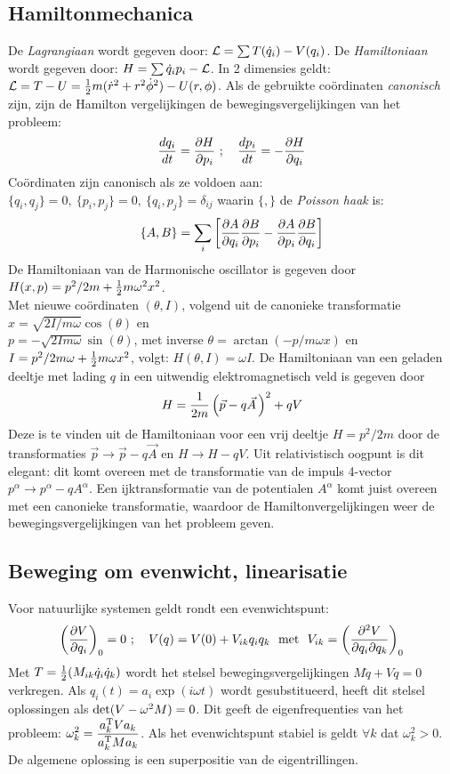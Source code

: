 \documentclass[twoside]{report}
\begin{document}
\subsection{Hamiltonmechanica}
De {\it Lagrangiaan} wordt gegeven door: ${\cal L}=\sum T(\dot{q}_i)-V(q_i)$.
De {\it Hamiltoniaan} wordt gegeven door: $H=\sum\dot{q}_ip_i-{\cal L}$. In 2
dimensies geldt: ${\cal L}=T-U=\mbox{$\frac{1}{2}$} m(\dot{r}^2+r^2\dot{\phi}^2)-U(r,\phi)$.
\npar
Als de gebruikte co\"ordinaten {\it canonisch} zijn, zijn de Hamilton
vergelijkingen de bewegingsvergelijkingen van het probleem:
\[
\frac{dq_i}{dt}=\frac{\partial H}{\partial p_i}~;~~~\frac{dp_i}{dt}=-\frac{\partial H}{\partial q_i}
\]
Co\"ordinaten zijn canonisch als ze voldoen aan:
$\{q_i,q_j\}=0,~\{p_i,p_j\}=0,~\{q_i,p_j\}=\delta_{ij}$ waarin $\{,\}$ de
{\it Poisson haak} is:
\[
\{A,B\}=\sum\limits_i\left[\frac{\partial A}{\partial q_i}\frac{\partial B}{\partial p_i}-\frac{\partial A}{\partial p_i}\frac{\partial B}{\partial q_i}\right]
\]
De Hamiltoniaan van de Harmonische oscillator is gegeven door
$H(x,p)=p^2/2m+\mbox{$\frac{1}{2}$} m\omega^2 x^2$.\\ Met nieuwe co\"ordinaten $(\theta,I)$,
volgend uit de canonieke transformatie $x=\sqrt{2I/m\omega}\cos(\theta)$ en\\
$p=-\sqrt{2Im\omega}\sin(\theta)$, met inverse $\theta=\arctan(-p/m\omega x)$
en $I=p^2/2m\omega+\mbox{$\frac{1}{2}$} m\omega x^2$, volgt: $H(\theta,I)=\omega I$.
\npar
De Hamiltoniaan van een geladen deeltje met lading $q$ in een uitwendig
elektromagnetisch veld is gegeven door
\[
H=\frac{1}{2m}\left(\vec{p}-q\vec{A}\,\right)^2+qV
\]
Deze is te vinden uit de Hamiltoniaan voor een vrij deeltje $H=p^2/2m$
door de transformaties $\vec{p}\rightarrow\vec{p}-q\vec{A}$ en
$H\rightarrow H-qV$. Uit relativistisch oogpunt is dit elegant: dit komt
overeen met de transformatie van de impuls 4-vector
$p^\alpha\rightarrow p^\alpha-qA^\alpha$. Een ijktransformatie van de
potentialen $A^\alpha$ komt juist overeen met een canonieke transformatie,
waardoor de Hamiltonvergelijkingen weer de bewegingsvergelijkingen van het
probleem geven.

\subsection{Beweging om evenwicht, linearisatie}
Voor natuurlijke systemen geldt rondt een evenwichtspunt:
\[
\left(\frac{\partial V}{\partial q_i}\right)_0=0~;~~~V(q)=V(0)+V_{ik}q_iq_k\mbox{~~met~~}
V_{ik}=\left(\frac{\partial^2V}{\partial q_i\partial q_k}\right)_0
\]
Met $T=\mbox{$\frac{1}{2}$}(M_{ik}\dot{q}_i\dot{q}_k)$ wordt het stelsel
bewegingsvergelijkingen $M\ddot{q}+Vq=0$ verkregen. Als
$q_i(t)=a_i\exp(i\omega t)$ wordt gesubstitueerd, heeft dit stelsel
oplossingen als ${\rm det}(V-\omega^2 M)=0$. Dit geeft de eigenfrequenties
van het probleem: $\displaystyle\omega^2_k=\frac{a_k^{\rm T}Va_k}{a_k^{\rm T}Ma_k}$.
Als het evenwichtspunt stabiel is geldt $\forall k$ dat $\omega^2_k>0$. De
algemene oplossing is een superpositie van de eigentrillingen.
\end{document}
